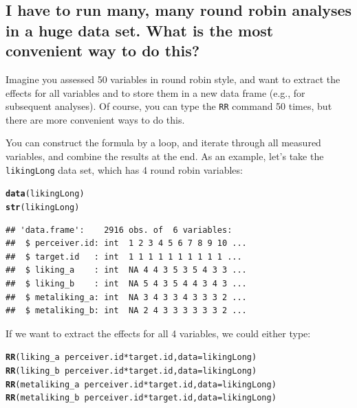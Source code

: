 \documentclass[a4paper]{article}\usepackage[]{graphicx}\usepackage[]{color}
\makeatletter
\newcommand{\hlopt}[1]{\textcolor[rgb]{0,0,0}{#1}}%
\newcommand{\hlstd}[1]{\textcolor[rgb]{0.345,0.345,0.345}{#1}}%
\newcommand{\hlkwc}[1]{\textcolor[rgb]{0.333,0.667,0.333}{#1}}%
\newcommand{\hlkwd}[1]{\textcolor[rgb]{0.737,0.353,0.396}{\textbf{#1}}}%
\newenvironment{kframe}{%
 \def\at@end@of@kframe{}%
 \ifinner\ifhmode%
  \def\at@end@of@kframe{\end{minipage}}%
  \begin{minipage}{\columnwidth}%
 \fi\fi%
 \def\FrameCommand##1{\hskip\@totalleftmargin \hskip-\fboxsep
 \colorbox{shadecolor}{##1}\hskip-\fboxsep
     \hskip-\linewidth \hskip-\@totalleftmargin \hskip\columnwidth}%
 \MakeFramed {\advance\hsize-\width
   \@totalleftmargin\z@ \linewidth\hsize
   \@setminipage}}%
 {\par\unskip\endMakeFramed%
 \at@end@of@kframe}
\newenvironment{knitrout}{}{} %
\makeatother
\begin{document}
\subsection{I have to run many, many round robin analyses in a huge data set. What is the most convenient way to do this?} %
\label{sub:i_have_to_run_many_many_round_robin_analyses_in_huge_data_set_what_is_the_most_convenient_way_to_do_this_}
Imagine you assessed 50 variables in round robin style, and want to extract the effects for all variables and to store them in a new data frame (e.g., for subsequent analyses). Of course, you can type the \texttt{RR} command 50 times, but there are more convenient ways to do this.

You can construct the formula by a loop, and iterate through all measured variables, and combine the results at the end. As an example, let's take the \texttt{likingLong} data set, which has 4 round robin variables:

\begin{knitrout}\small
{}\color{fgcolor}\begin{kframe}
\begin{alltt}
\hlkwd{data}\hlstd{(likingLong)}
\hlkwd{str}\hlstd{(likingLong)}
\end{alltt}
\begin{verbatim}
## 'data.frame':	2916 obs. of  6 variables:
##  $ perceiver.id: int  1 2 3 4 5 6 7 8 9 10 ...
##  $ target.id   : int  1 1 1 1 1 1 1 1 1 1 ...
##  $ liking_a    : int  NA 4 4 3 5 3 5 4 3 3 ...
##  $ liking_b    : int  NA 5 4 3 5 4 4 3 4 3 ...
##  $ metaliking_a: int  NA 3 4 3 3 4 3 3 3 2 ...
##  $ metaliking_b: int  NA 2 4 3 3 3 3 3 3 2 ...
\end{verbatim}
\end{kframe}
\end{knitrout}

If we want to extract the effects for all 4 variables, we could either type:

\begin{knitrout}\small
{}\color{fgcolor}\begin{kframe}
\begin{alltt}
\hlkwd{RR}\hlstd{(liking_a} \hlopt{~} \hlstd{perceiver.id} \hlopt{*} \hlstd{target.id,} \hlkwc{data} \hlstd{= likingLong)}
\hlkwd{RR}\hlstd{(liking_b} \hlopt{~} \hlstd{perceiver.id} \hlopt{*} \hlstd{target.id,} \hlkwc{data} \hlstd{= likingLong)}
\hlkwd{RR}\hlstd{(metaliking_a} \hlopt{~} \hlstd{perceiver.id} \hlopt{*} \hlstd{target.id,} \hlkwc{data} \hlstd{= likingLong)}
\hlkwd{RR}\hlstd{(metaliking_b} \hlopt{~} \hlstd{perceiver.id} \hlopt{*} \hlstd{target.id,} \hlkwc{data} \hlstd{= likingLong)}
\end{alltt}
\end{kframe}
\end{knitrout}
\end{document}
